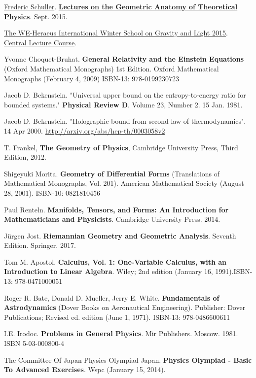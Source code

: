 \href{https://www.youtube.com/c/FredericSchuller}{Frederic Schuller}. \href{https://youtube.com/playlist?list=PLPH7f_7ZlzxTi6kS4vCmv4ZKm9u8g5yic}{\textbf{Lectures on the Geometric Anatomy of Theoretical Physics}}. Sept. 2015.

\href{https://www.youtube.com/@thewe-heraeusinternational2060/featured}{The WE-Heraeus International Winter School on Gravity and Light 2015}. \href{https://youtube.com/playlist?list=PLFeEvEPtX_0S6vxxiiNPrJbLu9aK1UVC_}{Central Lecture Course}.  

Yvonne Choquet-Bruhat.  \textbf{General Relativity and the Einstein Equations} (Oxford Mathematical Monographs) 1st Edition.  Oxford Mathematical Monographs (February 4, 2009) ISBN-13: 978-0199230723

Jacob D. Bekenstein. "Universal upper bound on the entropy-to-energy ratio for bounded systems." \textbf{Physical Review D}. Volume 23, Number 2. 15 Jan. 1981.

Jacob D. Bekenstein. "Holographic bound from second law of thermodynamics". 14 Apr 2000. \url{http://arxiv.org/abs/hep-th/0003058v2}


T. Frankel,
\textbf{The Geometry of Physics}, 
Cambridge University Press, 
Third Edition,
2012.

Shigeyuki Morita. \textbf{Geometry of Differential Forms} (Translations of Mathematical Monographs, Vol. 201). American Mathematical Society (August 28, 2001). ISBN-10: 0821810456

Paul Renteln. \textbf{Manifolds, Tensors, and Forms: An Introduction for Mathematicians and Physicists}. Cambridge University Press. 2014. 


J\"{u}rgen Jost. \textbf{Riemannian Geometry and Geometric Analysis}. Seventh Edition. Springer. 2017.

Tom M. Apostol. \textbf{Calculus, Vol. 1: One-Variable Calculus, with an Introduction to Linear Algebra}. Wiley; 2nd edition (January 16, 1991).ISBN-13: 978-0471000051

Roger R. Bate, Donald D. Mueller, Jerry E. White. \textbf{Fundamentals of Astrodynamics} (Dover Books on Aeronautical Engineering). Publisher: Dover Publications; Revised ed. edition (June 1, 1971). ISBN-13: 978-0486600611


I.E. Irodoc. \textbf{Problems in General Physics}. Mir Publishers. Moscow. 1981. ISBN 5-03-000800-4

The Committee Of Japan Physics Olympiad Japan. \textbf{Physics Olympiad - Basic To Advanced Exercises}.
Wspc (January 15, 2014).



